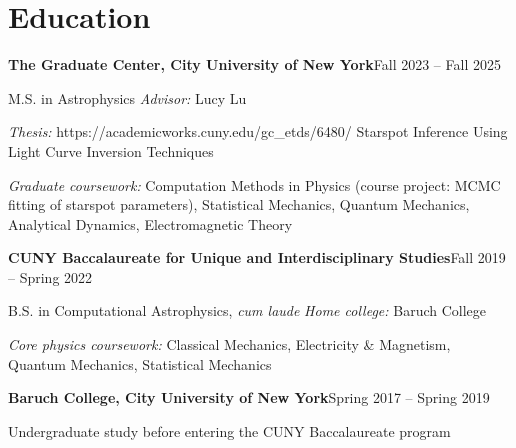 \section{Education}

\begin{compact}[1pt]
\textbf{The Graduate Center, City University of New York}\hfill Fall 2023 -- Fall 2025\par
M.S. in Astrophysics \enspace\textbar\enspace \textit{Advisor:} Lucy Lu\par
\textit{Thesis:}
\cvlink
  {https://academicworks.cuny.edu/gc_etds/6480/}
  {Starspot Inference Using Light Curve Inversion Techniques}\par
\textit{Graduate coursework:} Computation Methods in Physics (course project:
MCMC fitting of starspot parameters), Statistical Mechanics, Quantum Mechanics,
Analytical Dynamics, Electromagnetic Theory\par

\vspace{0.6em}

\textbf{CUNY Baccalaureate for Unique and Interdisciplinary Studies}\hfill Fall 2019 -- Spring 2022\par
B.S. in Computational Astrophysics, \emph{cum laude} \enspace\textbar\enspace \textit{Home college:} Baruch College\par
\textit{Core physics coursework:} Classical Mechanics,
Electricity \& Magnetism, Quantum Mechanics, Statistical Mechanics\par

\vspace{0.6em}

\textbf{Baruch College, City University of New York}\hfill Spring 2017 -- Spring 2019\par
Undergraduate study before entering the CUNY Baccalaureate program\par
\end{compact}
